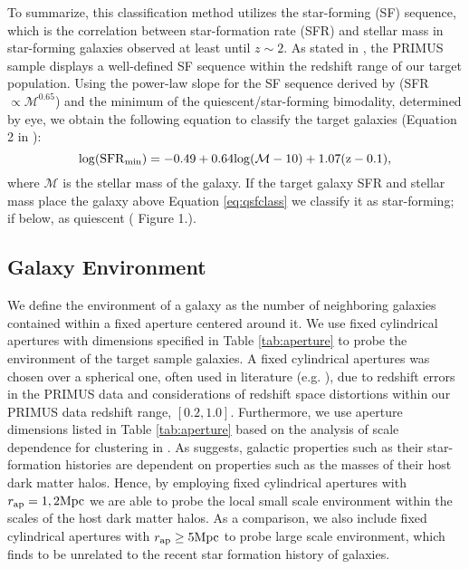 \documentclass{emulateapj}
\begin{document}
To summarize, this classification method utilizes the star-forming (SF) sequence, which is the correlation between star-formation rate (SFR) and stellar mass in star-forming 
galaxies observed at least until $z \sim 2$.
As stated in \cite{Moustakas:2013aa}, the PRIMUS sample displays a well-defined SF sequence within the redshift range of our target population.
Using the power-law slope for the SF sequence derived by \cite{Salim:2007aa} (SFR $\propto \mathcal{M}^{0.65}$) and the minimum of the quiescent/star-forming bimodality, 
determined by eye, we obtain the following equation to classify the target galaxies (Equation 2 in \cite{Moustakas:2013aa}):
\begin{equation}
\label{eq:qsfclass} 
\rm{log}(\rm{SFR}_{\rm{min}}) = -0.49 + 0.64 \rm{log}(\mathcal{M} - 10) +1.07(z-0.1), 
\end{equation}
where $\mathcal{M}$ is the stellar mass of the galaxy.
If the target galaxy SFR and stellar mass place the galaxy above Equation \ref{eq:qsfclass} we classify it as star-forming; if below, as quiescent (\cite{Moustakas:2013aa} Figure 1.).

\subsection{Galaxy Environment} \label{sec:environment}
We define the environment of a galaxy as the number of neighboring galaxies contained within a fixed aperture centered around it.
We use fixed cylindrical apertures with dimensions specified in Table \ref{tab:aperture} to probe the environment of the target sample galaxies. 
A fixed cylindrical apertures was chosen over a spherical one, often used in literature (e.g. \cite{Croton:2005aa}), due to redshift errors in the PRIMUS data 
and considerations of redshift space distortions within our PRIMUS data redshift range, $[0.2,1.0]$.
Furthermore, we use aperture dimensions listed in Table \ref{tab:aperture} based on the analysis of scale dependence for clustering in \cite{Blanton:2006aa}.
As \cite{Blanton:2006aa} suggests, galactic properties such as their star-formation histories are dependent on properties such as the masses of their host dark matter halos.
Hence, by employing fixed cylindrical apertures with $r_{\rm{ap}} = 1, 2 \rm{Mpc}$ we are able to probe the local small scale environment within the scales of the host dark matter halos.
As a comparison, we also include fixed cylindrical apertures with $r_{\rm{ap}} \ge 5 \rm{Mpc}$ to probe large scale environment, which \cite{Blanton:2006aa} finds to be unrelated to the 
recent star formation history of galaxies.
\end{document}
